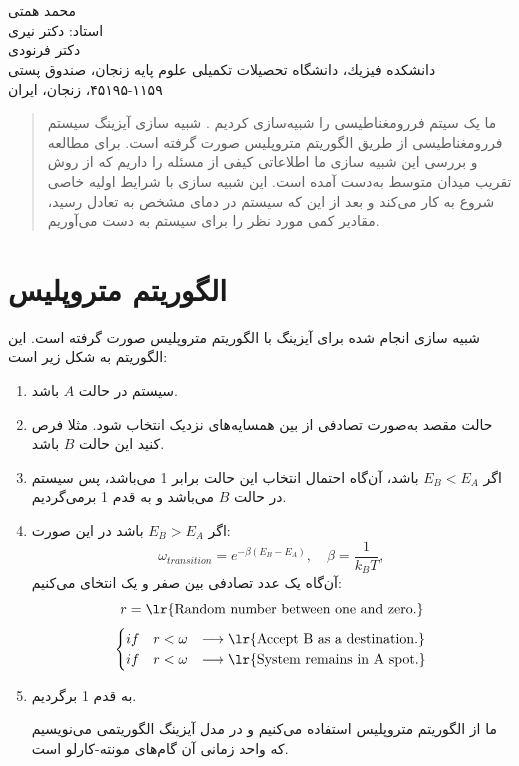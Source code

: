 \documentclass[a4paper,12pt]{article}
\begin{document}
\date{}

\begin{center}
\fontsize{25pt}{25pt}\selectfont{شبیه سازی شبکه آیزینگ دو‌بعدی با روش مونته-کارلو}\\
\end{center}
\begin{center}
\\
محمد همتی \\
استاد: دکتر نیری \\
 دکتر فرنودی\\
\medskip
\large{
دانشكده فیزیك، دانشگاه تحصیلات تكمیلی علوم پایه زنجان، صندوق پستی ۱۱۵۹-۴۵۱۹۵، زنجان، ایران}
\end{center}
\bigskip


\begin{abstract}
ما یک سیتم فررومغناطیسی را شبیه‌سازی کردیم . شبیه سازی آیزینگ سیستم
فررومغناطیسی از طریق الگوریتم متروپلیس صورت‌ گرفته است.
برای مطالعه و بررسی این شبیه سازی ما اطلاعاتی کیفی از
مسئله را داریم که از روش تقریب میدان متوسط به‌دست آمده است.
این شبیه سازی با شرایط اولیه خاصی شروع به کار می‌کند و
بعد از این که سیستم در دمای مشخص به تعادل رسید، مقادیر کمی
مورد نظر را برای سیستم به دست می‌آوریم.

\end{abstract}
\section{الگوریتم متروپلیس}
شبیه سازی انجام شده برای آیزینگ با الگوریتم متروپلیس صورت گرفته است.
این الگوریتم به شکل زیر است:
\begin{enumerate}
 \item سیستم در حالت 
 $A$
 باشد.
 \item حالت مقصد به‌صورت تصادفی از بین همسایه‌های نزدیک انتخاب شود. 
 مثلا فرص کنید این حالت 
 $B$
 باشد.
 \item اگر $E_B<E_A$
 باشد، آن‌گاه احتمال انتخاب این حالت برابر 1 می‌باشد، پس
 سیستم در حالت $B$ می‌باشد و به قدم 1 برمی‌گردیم.
 \item اگر
 $E_B>E_A$
 باشد در این صورت:
 $$
 \omega_{transition}=e^{-\beta(E_B-E_A)} ,\quad \beta=\frac{1}{k_BT},
 $$
 آن‌گاه یک عدد تصادفی بین صفر و یک انتخای می‌کنیم:
 $$
 r=\text{\lr{Random number between one and zero.}}
 $$
 $$
\begin{cases}
 if\quad r<\omega& \longrightarrow \text{\lr{Accept B as a destination.}}\\
 if\quad r<\omega& \longrightarrow \text{\lr{System remains in A spot.}}
\end{cases}
$$
 \item به قدم 1 برگردیم.
 
ما از الگوریتم متروپلیس استفاده می‌کنیم و در مدل آیزینگ الگوریتمی
می‌نویسیم که واحد زمانی آن گام‌های مونته-کارلو است.
\end{enumerate}
\end{document}
